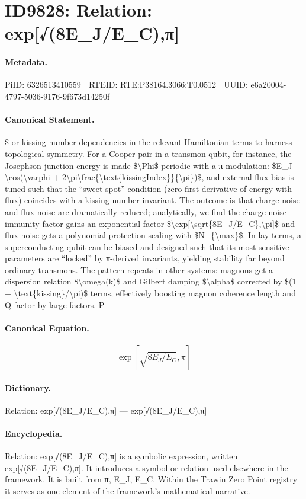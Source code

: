 \section*{ID9828: Relation: exp[√(8E\_J/E\_C),π]}
\paragraph{Metadata.}
PiID: 6326513410559 | RTEID: RTE:P38164.3066:T0.0512 | UUID: e6a20004-4797-5036-9176-9f673d14250f

\paragraph{Canonical Statement.}
\$ or kissing-number dependencies in the relevant Hamiltonian terms to harness topological symmetry. For a Cooper pair in a transmon qubit, for instance, the Josephson junction energy is made \$\textbackslash{}Phi\$-periodic with a π modulation: \$E\_J \textbackslash{}cos(\textbackslash{}varphi + 2\textbackslash{}pi\textbackslash{}frac\{\textbackslash{}text\{kissingIndex\}\}\{\textbackslash{}pi\})\$, and external flux bias is tuned such that the “sweet spot” condition (zero first derivative of energy with flux) coincides with a kissing-number invariant. The outcome is that charge noise and flux noise are dramatically reduced; analytically, we find the charge noise immunity factor gains an exponential factor \$\textbackslash{}exp[\textbackslash{}sqrt\{8E\_J/E\_C\},\textbackslash{}pi]\$ and flux noise gets a polynomial protection scaling with \$N\_\{\textbackslash{}max\}\$. In lay terms, a superconducting qubit can be biased and designed such that its most sensitive parameters are “locked” by π-derived invariants, yielding stability far beyond ordinary transmons. The pattern repeats in other systems: magnons get a dispersion relation \$\textbackslash{}omega(k)\$ and Gilbert damping \$\textbackslash{}alpha\$ corrected by \$(1 + \textbackslash{}text\{kissing\}/\textbackslash{}pi)\$ terms, effectively boosting magnon coherence length and Q-factor by large factors. P

\paragraph{Canonical Equation.}
\[
\exp[\sqrt{8E_J/E_C},\pi]
\]

\paragraph{Dictionary.}
Relation: exp[√(8E\_J/E\_C),π] — exp[√(8E\_J/E\_C),π]

\paragraph{Encyclopedia.}
Relation: exp[√(8E\_J/E\_C),π] is a symbolic expression, written exp[√(8E\_J/E\_C),π]. It introduces a symbol or relation used elsewhere in the framework. It is built from π, E\_J, E\_C. Within the Trawin Zero Point registry it serves as one element of the framework's mathematical narrative.
